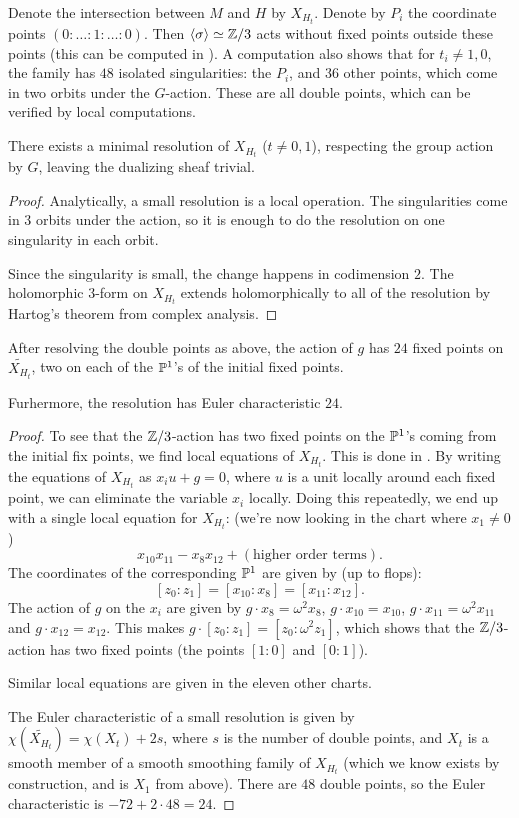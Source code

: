 Denote the intersection between $M$ and $H$ by $X_{H_t}$. Denote by $P_i$ the coordinate points $(0:\ldots:1:\ldots:0)$. Then $\langle \sigma \rangle \simeq \Z/3$ acts without fixed points outside these points (this can be computed in \MM). A \MM computation also shows that for $t_i \neq 1,0$, the family has $48$ isolated singularities: the $P_i$, and $36$ other points, which come in two orbits under the $G$-action. These are all double points, which can be verified by local computations.

\begin{lemma}
There exists a minimal resolution of $X_{H_t}$ ($t \neq 0,1$), respecting the group action by $G$, leaving the dualizing sheaf trivial.
\end{lemma}
\begin{proof}
Analytically, a small resolution is a local operation. The singularities come in $3$ orbits under the action, so it is enough to do the resolution on one singularity in each orbit.

Since the singularity is small, the change happens in codimension $2$. The holomorphic $3$-form on $X_{H_t}$ extends holomorphically to all of the resolution by Hartog's theorem from complex analysis.
\end{proof}

\begin{lemma}
After resolving the double points as above, the action of $g$ has $24$ fixed points on $\widetilde{X_{H_t}}$, two on each of the $\P^1$'s of the initial fixed points.

Furhermore, the resolution has Euler characteristic $24$.
\end{lemma}
\begin{proof}
To see that the $\Z/3$-action has two fixed points on the $\P^1$'s coming from the initial fix points, we find local equations of $X_{H_t}$. This is done in \MM. By writing the equations of $X_{H_t}$ as $x_iu+g=0$, where $u$ is a unit locally around each fixed point, we can eliminate the variable $x_i$ locally. Doing this repeatedly, we end up with a single local equation for $X_{H_t}$: (we're now looking in the chart where $x_1 \neq 0$)
\[
x_{10}x_{11}-x_8x_{12} + (\text{higher order terms}).
\]
The coordinates of the corresponding $\P^1$ are given by (up to flops):
\[
[z_0:z_1] = [x_{10}:x_8] = [x_{11}:x_{12}].
\]
The action of $g$ on the $x_i$ are given by $g \cdot x_8 = \omega^2 x_8$, $g \cdot x_{10} = x_{10}$, $g \cdot x_{11} = \omega^2 x_{11}$ and $g \cdot x_{12} = x_{12}$. This makes $ g \cdot [z_0:z_1] = [z_0:\omega^2 z_1]$, which shows that the $\Z/3$-action has two fixed points (the points $[1:0]$ and $[0:1]$).

Similar local equations are given in the eleven other charts.

The Euler characteristic of a small resolution is given by $\chi(\widetilde{X_{H_t}}) = \chi(X_t) + 2s$, where $s$ is the number of double points, and $X_t$ is a smooth member of a smooth smoothing family of $X_{H_t}$ (which we know exists by construction, and is $X_1$ from above). There are $48$ double points, so the Euler characteristic is $-72+2 \cdot 48 = 24$.
\end{proof}

